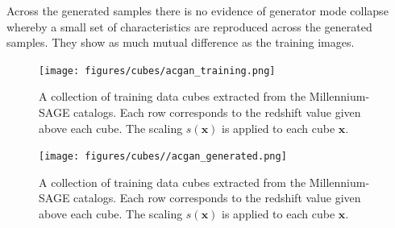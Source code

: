 \documentclass[twocolumn]{article}
\numberwithin{equation}{section}
\begin{document}
Across the generated samples there is no evidence of generator mode collapse whereby a small set of characteristics are 
reproduced across the generated samples. They show as much mutual difference as the training images.


\begin{figure}[hbt!]
\texttt{[image: figures/cubes/acgan\_training.png]} %
\centering
\caption{A collection of training data cubes extracted from the Millennium-SAGE catalogs. Each row corresponds to the 
         redshift value given above each cube. The scaling $s(\mathbf{x})$ is applied to each cube $\mathbf{x}$.}
\label{fig:t_z_imgs}
\end{figure}

\begin{figure}[hbt!]
\texttt{[image: figures/cubes//acgan\_generated.png]} %
\centering
\caption{A collection of training data cubes extracted from the Millennium-SAGE catalogs. Each row corresponds to the 
         redshift value given above each cube. The scaling $s(\mathbf{x})$ is applied to each cube $\mathbf{x}$.}
\label{fig:g_z_imgs}
\end{figure}



\end{document}
